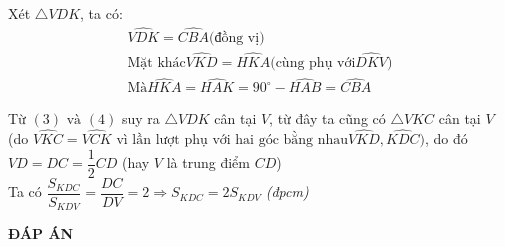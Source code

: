 \begin{ex}
{\begin{enumerate}
		Xét $\triangle VDK$, ta có:
	\begin{align}
		\widehat{VDK}=\widehat{CBA} \mbox{(đồng vị)}\\
		\mbox{Mặt khác} \widehat{VKD}=\widehat{HKA} \mbox{(cùng phụ với} \widehat{DKV})\nonumber \\
		\mbox{Mà} \widehat{HKA}=\widehat{HAK}=90^\circ-\widehat{HAB}=\widehat{CBA} 
	\end{align}
	\end{enumerate}
		Từ $(3)\text{ và }(4)$ suy ra $\triangle VDK$ cân tại $V$, từ đây ta cũng có $\triangle VKC$ cân tại 
$V$ \break(do $\widehat{VKC}=\widehat{VCK}\text{ vì lần lượt phụ với hai góc bằng nhau}\widehat{VKD},\widehat{KDC})
$, do đó $VD=DC=\dfrac{1}{2}CD$ (hay $V$ là trung điểm $CD$)\\
Ta có  $\dfrac{S_{KDC}}{S_{KDV}}=\dfrac{DC}{DV}=2 \Rightarrow S_{KDC}=2S_{KDV}$ \textit{(đpcm)}
}
\end{ex}
\newpage
\begin{center}
	\textbf{ĐÁP ÁN}
\end{center}
\begin{multicols}{10}
	 
\end{multicols}